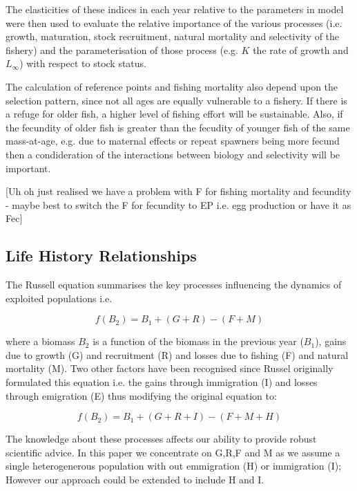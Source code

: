 \documentclass{pnastwo}
\begin{document}
\begin{article}
The elasticities of these indices in each year relative to the parameters in model were then used to
evaluate the relative importance of the various processes (i.e. growth, maturation, stock recruitment, natural mortality and selectivity of the fishery)
and the parameterisation of those process (e.g. $K$ the rate of growth and $L_{\infty}$) with respect to stock status. 

The calculation of reference points and fishing mortality also  depend upon the selection pattern,  
since not all ages are equally vulnerable to a fishery. If there is a refuge for older fish, a higher level of fishing effort will be sustainable.
Also, if the fecundity of older fish is greater than the fecudity of younger fish of the same mass-at-age, e.g. due to maternal effects or repeat
spawners being more fecund then a condideration of the interactions between biology and selectivity will be important.

[Uh oh just realised we have a problem with F for fishing mortality and fecundity - maybe best to switch the F for fecundity to EP i.e. egg production or have it as Fec]



\subsection{Life History Relationships}

The Russell equation \cite{russell1931some} summarises the key processes influencing the dynamics of exploited populations i.e.
 
\begin{equation}f(B_2) = B_1 + (G + R) - (F+M)\end{equation}

where a biomass $B_2$ is a function of the biomass in the previous year ($B_1$), gains due to growth (G) and recruitment (R) and losses due to 
fishing (F) and natural mortality (M). Two other factors have been recognised since Russel originally formulated this equation i.e. 
the gains through immigration (I) and losses through emigration (E) thus modifying the original equation to:

\begin{equation}f(B_2) = B_1 + (G+R+I) - (F+M+H)\end{equation}

The knowledge about these processes affects our ability to provide robust scientific advice. In this paper we concentrate 
on G,R,F and M as we assume a single heterogenerous population with out emmigration (H) or immigration (I); However our approach could be extended to include H and I.


\end{article}
\end{document}
